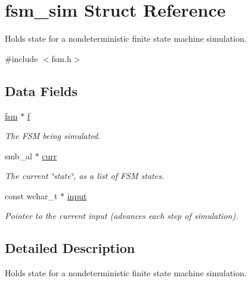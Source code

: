 \hypertarget{structfsm__sim}{\section{fsm\-\_\-sim \-Struct \-Reference}
\label{structfsm__sim}
}


\-Holds state for a nondeterministic finite state machine simulation.  




{\ttfamily \#include $<$fsm.\-h$>$}

\subsection*{\-Data \-Fields}
\begin{DoxyCompactItemize}
\item 
\hypertarget{structfsm__sim_adb419c73376b8d2d2393ffb15910f71b}{\hyperlink{structfsm}{fsm} $\ast$ \hyperlink{structfsm__sim_adb419c73376b8d2d2393ffb15910f71b}{f}}\label{structfsm__sim_adb419c73376b8d2d2393ffb15910f71b}

\begin{DoxyCompactList}\small\item\em \-The \-F\-S\-M being simulated. \end{DoxyCompactList}\item 
\hypertarget{structfsm__sim_a2a263ebdc022dbb02c7d4bb15c344f7c}{smb\-\_\-al $\ast$ \hyperlink{structfsm__sim_a2a263ebdc022dbb02c7d4bb15c344f7c}{curr}}\label{structfsm__sim_a2a263ebdc022dbb02c7d4bb15c344f7c}

\begin{DoxyCompactList}\small\item\em \-The current \char`\"{}state\char`\"{}, as a list of \-F\-S\-M states. \end{DoxyCompactList}\item 
\hypertarget{structfsm__sim_a74887a771d3c8894c79c2d4a18aaa682}{const wchar\-\_\-t $\ast$ \hyperlink{structfsm__sim_a74887a771d3c8894c79c2d4a18aaa682}{input}}\label{structfsm__sim_a74887a771d3c8894c79c2d4a18aaa682}

\begin{DoxyCompactList}\small\item\em \-Pointer to the current input (advances each step of simulation). \end{DoxyCompactList}\end{DoxyCompactItemize}


\subsection{\-Detailed \-Description}
\-Holds state for a nondeterministic finite state machine simulation. 

